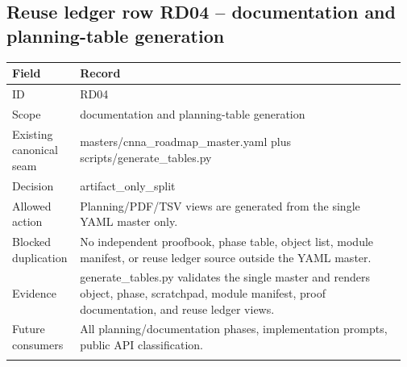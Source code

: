 \subsection*{Reuse ledger row RD04 -- documentation and planning-table generation}
\begin{longtable}{L{0.16\linewidth} L{0.81\linewidth}}
\hline
\textbf{Field} & \textbf{Record}\\
\hline
ID & RD04\\
\hline\addlinespace[0.20em]
Scope & documentation and planning-table generation\\
\hline\addlinespace[0.20em]
Existing canonical seam & masters/\allowbreak{}cnna\_roadmap\_master.yaml plus scripts/\allowbreak{}generate\_tables.py\\
\hline\addlinespace[0.20em]
Decision & artifact\_only\_split\\
\hline\addlinespace[0.20em]
Allowed action & Planning/\allowbreak{}PDF/\allowbreak{}TSV views are generated from the single YAML master only.\\
\hline\addlinespace[0.20em]
Blocked duplication & No independent proofbook, phase table, object list, module manifest, or reuse ledger source outside the YAML master.\\
\hline\addlinespace[0.20em]
Evidence & generate\_tables.py validates the single master and renders object, phase, scratchpad, module manifest, proof documentation, and reuse ledger views.\\
\hline\addlinespace[0.20em]
Future consumers & All planning/\allowbreak{}documentation phases, implementation prompts, public API classification.\\
\hline\addlinespace[0.20em]
\end{longtable}
